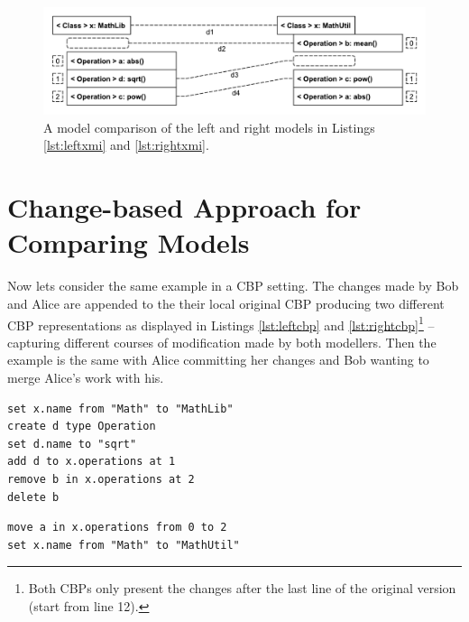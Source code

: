 \documentclass{jot}
\begin{document}
\begin{figure}
    \includegraphics[width=\linewidth]{XmiComparison}
    \caption{A model comparison of the left and right models in Listings \ref{lst:leftxmi} and \ref{lst:rightxmi}.}
    \label{fig:xmi_comparison}
\end{figure}

\section{Change-based Approach for Comparing Models}
\label{sec:change_based_approach_for_comparing_models}

Now lets consider the same example in a CBP setting.
The changes made by Bob and Alice are appended to the their local original CBP producing two different CBP representations as displayed in Listings \ref{lst:leftcbp} and \ref{lst:rightcbp}\footnote{Both CBPs only present the changes after the last line of the original version (start from line 12).} -- capturing different courses of modification made by both modellers.
Then the example is the same with Alice committing her changes and Bob wanting to merge Alice's work with his. 


\begin{minipage}[t]{0.49\linewidth}    
\begin{lstlisting}[firstnumber=12,style=eol,caption={The appended changes made by Bob to produce the model in Fig. \ref{fig:left}  (left version).},label=lst:leftcbp]
set x.name from "Math" to "MathLib"
create d type Operation
set d.name to "sqrt"
add d to x.operations at 1
remove b in x.operations at 2
delete b
\end{lstlisting}
\end{minipage}
\hfill
\begin{minipage}[t]{0.49\linewidth}
\begin{lstlisting}[firstnumber=13,style=eol,caption={The appended changes made by Alice to produce the model in Fig. \ref{fig:right} (right version).},label=lst:rightcbp]
move a in x.operations from 0 to 2
set x.name from "Math" to "MathUtil"
\end{lstlisting}
\end{minipage}
\end{document}
